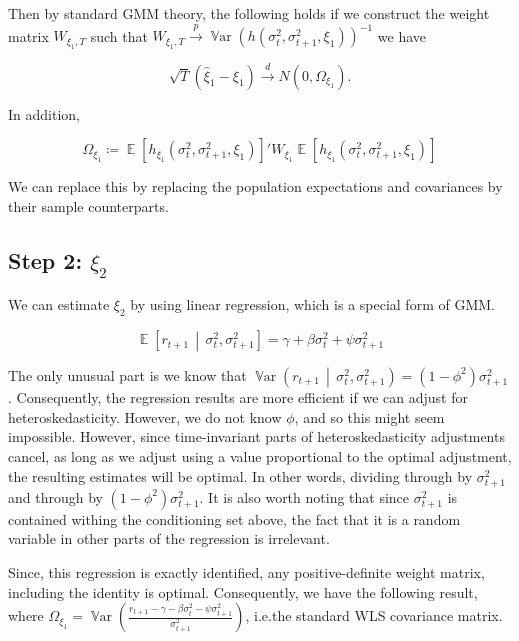 \documentclass[11pt, letterpaper, twoside, final]{article}
\newcommand*{\dto}{\overset{d}{\longrightarrow}}
\newcommand*{\pto}{\overset{p}{\longrightarrow}}
\newcommand*{\mvert}{\,\middle\vert\,}
\DeclareMathOperator*{\Var}{\mathbb{V}ar}
\DeclareMathOperator*{\E}{\mathbb{E}}
\begin{document}
Then by standard GMM theory, the following holds if we construct the weight matrix $W_{\xi_1,T}$ such that
$W_{{\xi}_1,T} \pto \Var(h(\sigma^2_{t},\sigma^2_{t+1}, \xi_1))^{-1}$ we have 

\begin{equation}
    \sqrt{T}(\hat{\xi}_1 - \xi_1) \dto N\left(0, \Omega_{\xi_1}\right).
\end{equation}

In addition, 

\begin{equation}
    \Omega_{\xi_1} \coloneqq \E\left[h_{\xi_1}(\sigma^2_{t}, \sigma^2_{t+1}, \xi_{1})\right]' W_{\xi_1}
    \E\left[h_{\xi_1}(\sigma^2_{t}, \sigma^2_{t+1}, \xi_{1})\right] 
\end{equation}

We can replace this by replacing the population expectations and covariances by their sample counterparts.

\subsection{Step 2: $\xi_2$}\label{sec:est_xi2}

We can estimate $\xi_2$ by using linear regression, which is a special form of GMM. 

\begin{equation}
    \E\left[r_{t+1} \mvert \sigma^2_t, \sigma^2_{t+1}\right]  = \gamma + \beta \sigma^2_t + \psi \sigma^2_{t+1}
\end{equation}

The only unusual part is we know that $\Var\left(r_{t+1} \mvert \sigma^2_t, \sigma^2_{t+1}\right) = (1-\phi^2)
\sigma^2_{t+1}$.
Consequently, the regression results  are more efficient if we can adjust for heteroskedasticity.
However, we do not know $\phi$, and so this might seem impossible.
However, since time-invariant parts of heteroskedasticity adjustments cancel, as long as we adjust using a value
proportional to the optimal adjustment, the resulting estimates will be optimal.
In other words, dividing through by $\sigma^2_{t+1}$ and through by $(1-\phi^2) \sigma^2_{t+1}$.
It is also worth noting that since $\sigma^2_{t+1}$ is contained withing the conditioning set above, the fact that
it is a random variable in other parts  of the regression is irrelevant.

Since, this regression is exactly identified, any positive-definite weight matrix, including the identity is
optimal.
Consequently, we have the following result, where $\Omega_{\xi_1} = \Var(\frac{r_{t+1} - \gamma - \beta
\sigma^2_{t} - \psi \sigma^2_{t+1}}{\sigma^2_{t+1}})$, i.e.\@ the standard WLS covariance matrix.
\end{document}

